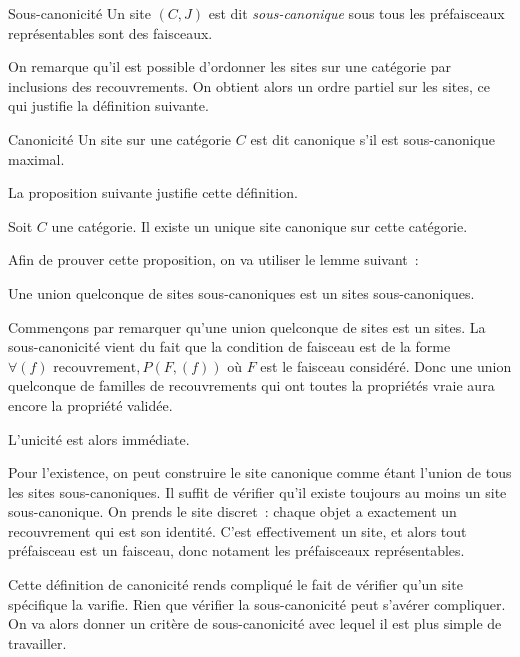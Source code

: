
\begin{defi}{Sous-canonicité}
    Un site $(C,J)$ est dit \emph{sous-canonique} sous tous les préfaisceaux
    représentables sont des faisceaux.
\end{defi}

On remarque qu'il est possible d'ordonner les sites sur une catégorie par inclusions
des recouvrements. On obtient alors un ordre partiel sur les sites, ce qui justifie
la définition suivante.

\begin{defi}{Canonicité}
    Un site sur une catégorie $C$ est dit canonique s'il est sous-canonique maximal.
\end{defi}

La proposition suivante justifie cette définition.

\begin{prop}
    Soit $C$ une catégorie. Il existe un unique site canonique sur cette catégorie.
\end{prop}

\begin{pv}
    Afin de prouver cette proposition, on va utiliser le lemme suivant~:

    \begin{lem}
        Une union quelconque de sites sous-canoniques est un sites sous-canoniques.
    \end{lem}
    \begin{pv}
        Commençons par remarquer qu'une union quelconque de sites est un sites.
        La sous-canonicité vient du fait que la condition de faisceau est de la
        forme $\forall (f)\text{ recouvrement}, P(F,(f))$ où $F$ est le
        faisceau considéré.  Donc une union quelconque de familles de
        recouvrements qui ont toutes la propriétés vraie aura encore la
        propriété validée.
    \end{pv}

    L'unicité est alors immédiate.

    Pour l'existence, on peut construire le site canonique comme étant l'union
    de tous les sites sous-canoniques. Il suffit de vérifier qu'il existe toujours
    au moins un site sous-canonique. On prends le site discret~: chaque objet a
    exactement un recouvrement qui est son identité. C'est effectivement un site,
    et alors tout préfaisceau est un faisceau, donc notament les préfaisceaux
    représentables.
\end{pv}

Cette définition de canonicité rends compliqué le fait de vérifier qu'un site
spécifique la varifie. Rien que vérifier la sous-canonicité peut s'avérer compliquer. On
va alors donner un critère de sous-canonicité avec lequel il est plus simple de
travailler.

